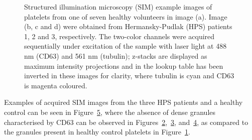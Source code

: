 \begin{figure}[htbp]\centering
	\begin{subfigure}[b]{0.49\linewidth}
		\centering
		\caption{}
		\label{figure:image_acquisition:sim_platelets:control}
	\end{subfigure}
	\begin{subfigure}[b]{0.49\linewidth}
		\centering
		\caption{}
		\label{figure:image_acquisition:sim_platelets:hps_1}
	\end{subfigure}
	\begin{subfigure}[b]{0.49\linewidth}
		\centering
		\caption{}
		\label{figure:image_acquisition:sim_platelets:hps_2}
	\end{subfigure}
	\begin{subfigure}[b]{0.49\linewidth}
		\centering
		\caption{}
		\label{figure:image_acquisition:sim_platelets:hps_3}
	\end{subfigure}
	\caption[Structured illumination microscopy images of platelets]{Structured illumination microscopy (SIM) example images of platelets from one of seven healthy volunteers in image (a). Image (b, c and d) were obtained from Hermansky-Pudlak (HPS) patients 1, 2 and 3, respectively. The two-color channels were acquired sequentially under excitation of the sample with laser light at 488 nm (CD63) and 561 nm (tubulin); z-stacks are displayed as maximum intensity projections and in the lookup table has been inverted in these images for clarity, where tubulin is cyan and CD63 is magenta coloured.}
	\label{figure:image_acquisition:sim_platelets}
\end{figure}

Examples of acquired SIM images from the three HPS patients and a healthy control can be seen in Figure~\ref{figure:image_acquisition:sim_platelets}, where the absence of dense granules characterised by CD63 can be observed in Figures~\ref{figure:image_acquisition:sim_platelets:hps_1},~\ref{figure:image_acquisition:sim_platelets:hps_2}, and~\ref{figure:image_acquisition:sim_platelets:hps_3}, as compared to the granules present in healthy control platelets in Figure~\ref{figure:image_acquisition:sim_platelets:control}.

